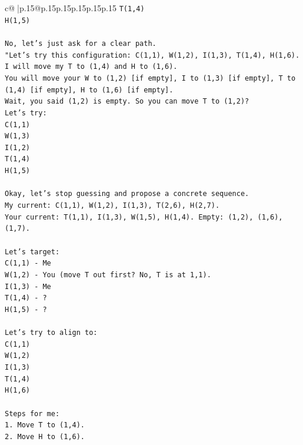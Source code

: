 \documentclass{article}
\begin{document}
{\begin{supertabular}{c@{$\;$}|p{.15\linewidth}@{}p{.15\linewidth}p{.15\linewidth}p{.15\linewidth}p{.15\linewidth}p{.15\linewidth}}
{{{\texttt{T(1,4)} \\
\texttt{H(1,5)} \\
\\ 
\texttt{No, let's just ask for a clear path.} \\
\texttt{"Let's try this configuration: C(1,1), W(1,2), I(1,3), T(1,4), H(1,6).} \\
\texttt{I will move my T to (1,4) and H to (1,6).} \\
\texttt{You will move your W to (1,2) {[}if empty{]}, I to (1,3) {[}if empty{]}, T to (1,4) {[}if empty{]}, H to (1,6) {[}if empty{]}.} \\
\texttt{Wait, you said (1,2) is empty. So you can move T to (1,2)?} \\
\texttt{Let's try:} \\
\texttt{C(1,1)} \\
\texttt{W(1,3)} \\
\texttt{I(1,2)} \\
\texttt{T(1,4)} \\
\texttt{H(1,5)} \\
\\ 
\texttt{Okay, let's stop guessing and propose a concrete sequence.} \\
\texttt{My current: C(1,1), W(1,2), I(1,3), T(2,6), H(2,7).} \\
\texttt{Your current: T(1,1), I(1,3), W(1,5), H(1,4). Empty: (1,2), (1,6), (1,7).} \\
\\ 
\texttt{Let's target:} \\
\texttt{C(1,1) {-} Me} \\
\texttt{W(1,2) {-} You (move T out first? No, T is at 1,1).} \\
\texttt{I(1,3) {-} Me} \\
\texttt{T(1,4) {-} ?} \\
\texttt{H(1,5) {-} ?} \\
\\ 
\texttt{Let's try to align to:} \\
\texttt{C(1,1)} \\
\texttt{W(1,2)} \\
\texttt{I(1,3)} \\
\texttt{T(1,4)} \\
\texttt{H(1,6)} \\
\\ 
\texttt{Steps for me:} \\
\texttt{1. Move T to (1,4).} \\
\texttt{2. Move H to (1,6).} \\
}}}
\end{supertabular}}
\end{document}
